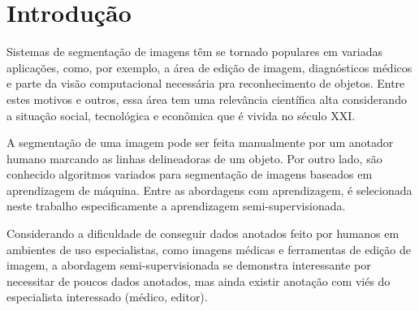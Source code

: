 \chapter{Introdução}\label{cap:introducao}

Sistemas de segmentação de imagens têm se tornado populares em
variadas aplicações, como, por exemplo, a área de edição de imagem,
diagnósticos médicos e parte da visão computacional necessária pra
reconhecimento de objetos. Entre estes motivos e outros, essa área tem
uma relevância científica alta considerando a situação social,
tecnológica e econômica que é vivida no século XXI.\@

\begin{figure}[h!]
        \captionsetup{width=16cm}
		\centering
\end{figure}


A segmentação de uma imagem pode ser feita manualmente por um anotador
humano marcando as linhas delineadoras de um objeto. Por outro lado,
são conhecido algoritmos variados para segmentação de imagens baseados
em aprendizagem de máquina. Entre as abordagens com aprendizagem, é
selecionada neste trabalho especificamente a aprendizagem
semi-supervisionada.


Considerando a dificuldade de conseguir dados anotados feito por
humanos em ambientes de uso especialistas, como imagens médicas e
ferramentas de edição de imagem, a abordagem semi-supervisionada se
demonstra interessante por necessitar de poucos dados anotados, mas ainda
existir anotação com viés do especialista interessado (médico,
editor).

